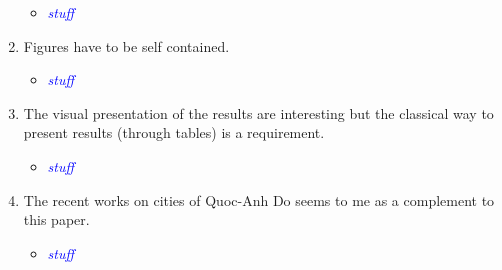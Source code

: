 \documentclass[12pt,onesided,fullpage]{amsart}
\begin{document}
\begin{enumerate}
\begin{itemize}
\item \textcolor{blue}{\emph{stuff}}
\end{itemize}

\item Figures have to be self contained.

\begin{itemize}
\item \textcolor{blue}{\emph{stuff}}
\end{itemize}

\item The visual presentation of the results are interesting but the classical way to present results (through tables) is a requirement.

\begin{itemize}
\item \textcolor{blue}{\emph{stuff}}
\end{itemize}

\item The recent works on cities of Quoc-Anh Do seems to me as a complement to this paper.

\begin{itemize}
\item \textcolor{blue}{\emph{stuff}}
\end{itemize}

\end{enumerate}

\newpage\tiny
\end{document}
